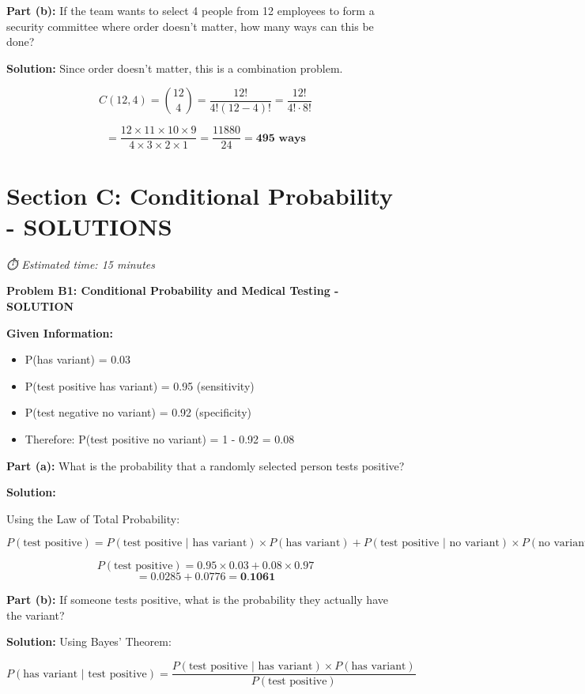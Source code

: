 \documentclass[
  11pt,
]{article}
\begin{document}
\textbf{Part (b):} If the team wants to select 4 people from 12
employees to form a security committee where order doesn't matter, how
many ways can this be done?

\textbf{Solution:} Since order doesn't matter, this is a combination
problem.

\[C(12,4) = \binom{12}{4} = \frac{12!}{4!(12-4)!} = \frac{12!}{4! \cdot 8!}\]

\[= \frac{12 \times 11 \times 10 \times 9}{4 \times 3 \times 2 \times 1} = \frac{11880}{24} = \textbf{495 ways}\]

\section{Section C: Conditional Probability -
SOLUTIONS}\label{section-c-conditional-probability---solutions}

\emph{⏱️ Estimated time: 15 minutes}

\textbf{Problem B1: Conditional Probability and Medical Testing -
SOLUTION}

\textbf{Given Information:}

\begin{itemize}
\item
  P(has variant) = 0.03
\item
  P(test positive \textbar{} has variant) = 0.95 (sensitivity)
\item
  P(test negative \textbar{} no variant) = 0.92 (specificity)
\item
  Therefore: P(test positive \textbar{} no variant) = 1 - 0.92 = 0.08
\end{itemize}

\textbf{Part (a):} What is the probability that a randomly selected
person tests positive?

\textbf{Solution:}

Using the Law of Total Probability:

\[P(\text{test positive}) = P(\text{test positive | has variant}) \times P(\text{has variant}) + P(\text{test positive | no variant}) \times P(\text{no variant})\]

\[P(\text{test positive}) = 0.95 \times 0.03 + 0.08 \times 0.97\]
\[= 0.0285 + 0.0776 = \textbf{0.1061}\]

\textbf{Part (b):} If someone tests positive, what is the probability
they actually have the variant?

\textbf{Solution:} Using Bayes' Theorem:

\[P(\text{has variant | test positive}) = \frac{P(\text{test positive | has variant}) \times P(\text{has variant})}{P(\text{test positive})}\]
\end{document}

